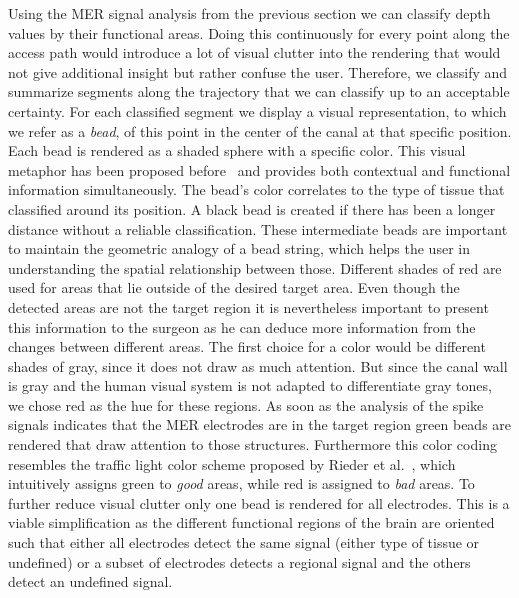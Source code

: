 \documentclass{vgtc}                          %
\begin{document}
Using the MER signal analysis from the previous section we can classify depth values by their functional areas. Doing this continuously for every point along the access path would introduce a lot of visual clutter into the rendering that would not give additional insight but rather confuse the user. Therefore, we classify and summarize segments along the trajectory that we can classify up to an acceptable certainty. For each classified segment we display a visual representation, to which we refer as a \emph{bead}, of this point in the center of the canal at that specific position. Each bead is rendered as a shaded sphere with a specific color. This visual metaphor has been proposed before~\cite{Miocinovic2007,Haese2005} and provides both contextual and functional information simultaneously. The bead's color correlates to the type of tissue that classified around its position. A black bead is created if there has been a longer distance without a reliable classification. These intermediate beads are important to maintain the geometric analogy of a bead string, which helps the user in understanding the spatial relationship between those. Different shades of red are used for areas that lie outside of the desired target area. Even though the detected areas are not the target region it is nevertheless important to present this information to the surgeon as he can deduce more information from the changes between different areas. The first choice for a color would be different shades of gray, since it does not draw as much attention. But since the canal wall is gray and the human visual system is not adapted to differentiate gray tones, we chose red as the hue for these regions. As soon as the analysis of the spike signals indicates that the MER electrodes are in the target region green beads are rendered that draw attention to those structures. Furthermore this color coding resembles the traffic light color scheme proposed by Rieder et al.~\cite{RIEDERREDGREEN}, which intuitively assigns green to {\it good} areas, while red is assigned to {\it bad} areas. To further reduce visual clutter only one bead is rendered for all electrodes. This is a viable simplification as the different functional regions of the brain are oriented such that either all electrodes detect the same signal (either type of tissue or undefined) or a subset of electrodes detects a regional signal and the others detect an undefined signal.
\end{document}
